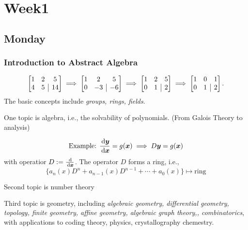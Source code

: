 
\chapter{Week1}

\section{Monday}

\subsection{Introduction to Abstract Algebra}
\[
\left[
\begin{array}{@{}cc|c@{}}
1 & 2 & 5 \\
4 & 5 & 14
\end{array}
\right]
\implies
\left[
\begin{array}{@{}cc|c@{}}
1 & 2 & 5 \\
0& -3 & -6
\end{array}
\right]
\implies
\left[
\begin{array}{@{}cc|c@{}}
1 & 2 & 5 \\
0& 1 & 2
\end{array}
\right]
\implies
\left[
\begin{array}{@{}cc|c@{}}
1 & 0 & 1 \\
0& 1 & 2
\end{array}
\right].
\]
The basic concepts include \emph{groups, rings, fields}.

One topic is algebra, i.e., the solvability of polynomials. (From Galois Theory to analysis)

\[
\mbox{Example: }
\frac{\,\mathrm{d} \bm y}{\,\mathrm{d}\bm x} = g(\bm x)\implies D\bm y=g(\bm x)
\]
with operatior $D:=\frac{\,\mathrm{d}}{\,\mathrm{d} \bm x}$. The operator $D$ forms a ring, i.e.,
\[
\{a_n(x)D^n+a_{n-1}(x)D^{n-1}+\cdots+a_0(x)\}\mapsto\mbox{ring}
\]

Second topic is number theory

Third topic is geometry, including \textit{algebraic geometry, differential geometry, topology, finite geometry, affine geometry, algebraic graph theory,, combinatorics}, with applications to coding theory, physics, crystallography chemestry.

